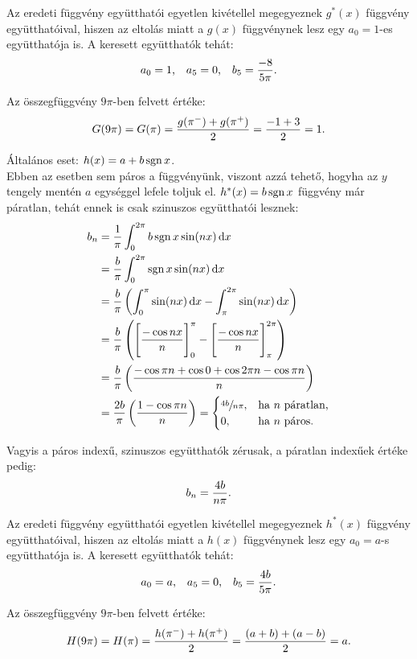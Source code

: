 \documentclass[exercise]{math-standalone}
\begin{document}
\begin{exercise}
{    Az eredeti függvény együtthatói egyetlen kivétellel megegyeznek $g^*(x)$
    függvény együtthatóival, hiszen az eltolás miatt a $g(x)$ függvénynek
    lesz egy $a_0 = 1$-es együtthatója is. A keresett együtthatók tehát:
    \[
      a_0 = 1
      \text,
      \quad
      a_5 = 0
      \text,
      \quad
      b_5 = \frac{-8}{5 \pi}
      \text.
    \]

    Az összegfüggvény $9\pi$-ben felvett értéke:
    \[
      G(9 \pi) = G(\pi) = \frac{g(\pi^-) + g(\pi^+)}{2} = \frac{-1+3}{2} = 1
      \text.
    \]

    \tcbline

    Általános eset: $h(x) = a + b \operatorname{sgn} x$. \\[3mm]
    Ebben az esetben sem páros a függvényünk, viszont azzá tehető, hogyha
    az $y$ tengely mentén $a$ egységgel lefele toljuk el. $h^*(x) = b \operatorname{sgn} x$
    függvény már páratlan, tehát ennek is csak szinuszos együtthatói lesznek:
    \begin{align*}
      b_n
       & = \frac{1}{\pi} \int_0^{2\pi} b \sgn x \sin(n x) \, \mathrm d x
      \\
       & = \frac{b}{\pi} \int_0^{2\pi} \sgn x \sin(n x) \, \mathrm d x
      \\
       & = \frac{b}{\pi} \left(
      \int_0^{\pi} \sin(n x) \, \mathrm d x -
      \int_\pi^{2\pi} \sin(n x) \, \mathrm d x
      \right)
      \\
       & = \frac{b}{\pi} \left(
      \Bigg[ \frac{-\cos n x}{n} \Bigg]_{0}^{\pi} -
      \Bigg[ \frac{-\cos n x}{n} \Bigg]_{\pi}^{2\pi}
      \right)
      \\
       & = \frac{b}{\pi} \left(
      \frac{%
        - \cos \pi n
        + \cos 0
        + \cos 2 \pi n
        - \cos \pi n
      }{n}
      \right)
      \\
       & = \frac{2b}{\pi} \left(
      \frac{1 - \cos \pi n}{n}
      \right)
      = \begin{cases}
          \sfrac{4b}{n \pi}, & \text{ha } n \text{ páratlan,} \\
          0,                 & \text{ha } n \text{ páros.}
        \end{cases}
    \end{align*}

    Vagyis a páros indexű, szinuszos együtthatók zérusak, a páratlan indexűek
    értéke pedig:
    \[
      b_n = \frac{4b}{n\pi}
      \text.
    \]

    Az eredeti függvény együtthatói egyetlen kivétellel megegyeznek $h^*(x)$
    függvény együtthatóival, hiszen az eltolás miatt a $h(x)$ függvénynek
    lesz egy $a_0 = a$-s együtthatója is. A keresett együtthatók tehát:
    \[
      a_0 = a
      \text,
      \quad
      a_5 = 0
      \text,
      \quad
      b_5 = \frac{4b}{5 \pi}
      \text.
    \]

    Az összegfüggvény $9\pi$-ben felvett értéke:
    \[
      H(9 \pi) = H(\pi) = \frac{h(\pi^-) + h(\pi^+)}{2} = \frac{(a+b)+(a-b)}{2} = a
      \text.
    \]
  }
\end{exercise}
\end{document}
